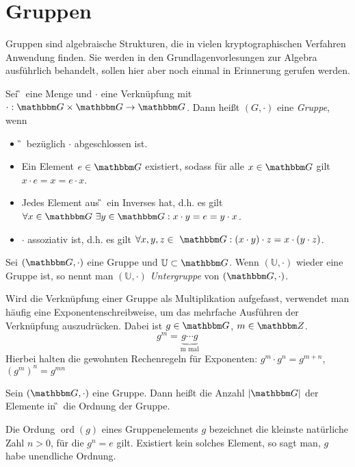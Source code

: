 \chapter{Gruppen}
Gruppen sind algebraische Strukturen, die in vielen kryptographischen
Verfahren Anwendung finden. Sie werden in den Grundlagenvorlesungen zur
Algebra ausführlich behandelt, sollen hier aber noch einmal in
Erinnerung gerufen werden.

\begin{definition}[Gruppe]
Sei \G~eine Menge und $\cdot$ eine Verknüpfung mit $\cdot: \G\times \G \to
\G$. Dann heißt $(G, \cdot)$ eine \textit{Gruppe}, wenn
\begin{itemize}
\item \G~bezüglich $\cdot$ abgeschlossen ist.
\item Ein Element $e \in \G$ existiert, sodass für alle $x \in \G$ gilt
  $x\cdot e=x=e\cdot x$.
\item Jedes Element aus \G~ein Inverses hat, d.h. es gilt $\forall x \in
  \G~ \exists y \in \G: x\cdot y=e=y\cdot x$.
\item $\cdot$ assoziativ ist,  d.h. es gilt $\forall x, y, z  \in ~\G:
  (x\cdot y)\cdot z = x\cdot(y \cdot z)$.
\end{itemize}
\end{definition}
\begin{definition}[Untergruppe]
  Sei $(\G, \cdot)$ eine Gruppe und $\mathbb{U} \subset \G$. Wenn
  $(\mathbb{U}, \cdot)$ wieder eine Gruppe ist, so nennt man $(\mathbb{U},
  \cdot)$ \textit{Untergruppe} von $(\G, \cdot)$.
\end{definition}

\begin{definition}
Wird die Verknüpfung einer Gruppe als Multiplikation aufgefasst,
verwendet man häufig eine Exponentenschreibweise, um das mehrfache
Ausführen der Verknüpfung auszudrücken. Dabei ist $g\in \G$, $m \in \Z{}$.
\[ g^m = \underbrace{g\cdots g}_{\text{m mal}} \]
Hierbei halten die gewohnten Rechenregeln für Exponenten: $g^m\cdot g^n =
g^{m+n}$, $(g^m)^n = g^{mn}$
\end{definition}


\begin{definition}
  Sein $(\G, \cdot)$ eine Gruppe. Dann heißt die Anzahl $|\G|$ der Elemente in
  \G~die Ordnung der Gruppe.
\end{definition}

\begin{definition}
  Die Ordung $\operatorname{ord}(g) $ eines Gruppenelements $g$
  bezeichnet die kleinste 
  natürliche Zahl $n>0$, für die $g^n = e$ gilt. Existiert kein solches
  Element, so sagt man, $g$ habe unendliche Ordnung.
 \end{definition}

